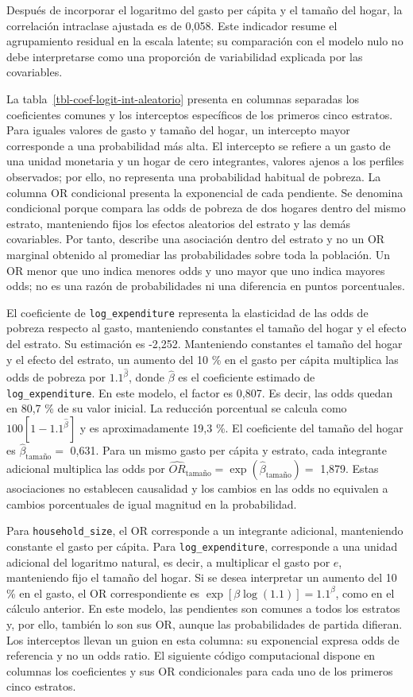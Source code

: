\documentclass[
  spanish,
  11pt,
  letterpaper,
  oneside,
  open=any]{scrbook}
\begin{document}
Después de incorporar el logaritmo del gasto per cápita y el tamaño del
hogar, la correlación intraclase ajustada es de 0,058. Este indicador
resume el agrupamiento residual en la escala latente; su comparación con
el modelo nulo no debe interpretarse como una proporción de variabilidad
explicada por las covariables.

La tabla~\ref{tbl-coef-logit-int-aleatorio} presenta en columnas
separadas los coeficientes comunes y los interceptos específicos de los
primeros cinco estratos. Para iguales valores de gasto y tamaño del
hogar, un intercepto mayor corresponde a una probabilidad más alta. El
intercepto se refiere a un gasto de una unidad monetaria y un hogar de
cero integrantes, valores ajenos a los perfiles observados; por ello, no
representa una probabilidad habitual de pobreza. La columna OR
condicional presenta la exponencial de cada pendiente. Se denomina
condicional porque compara las odds de pobreza de dos hogares dentro del
mismo estrato, manteniendo fijos los efectos aleatorios del estrato y
las demás covariables. Por tanto, describe una asociación dentro del
estrato y no un OR marginal obtenido al promediar las probabilidades
sobre toda la población. Un OR menor que uno indica menores odds y uno
mayor que uno indica mayores odds; no es una razón de probabilidades ni
una diferencia en puntos porcentuales.

El coeficiente de \texttt{log\_expenditure} representa la elasticidad de
las odds de pobreza respecto al gasto, manteniendo constantes el tamaño
del hogar y el efecto del estrato. Su estimación es -2,252. Manteniendo
constantes el tamaño del hogar y el efecto del estrato, un aumento del
10 \% en el gasto per cápita multiplica las odds de pobreza por
\(1.1^{\hat{\beta}}\), donde \(\hat{\beta}\) es el coeficiente estimado
de \texttt{log\_expenditure}. En este modelo, el factor es 0,807. Es
decir, las odds quedan en 80,7 \% de su valor inicial. La reducción
porcentual se calcula como \(100[1-1.1^{\hat{\beta}}]\) y es
aproximadamente 19,3 \%. El coeficiente del tamaño del hogar es
\(\hat\beta_{\mathrm{tamaño}}=\) 0,631. Para un mismo gasto per cápita y
estrato, cada integrante adicional multiplica las odds por
\(\widehat{OR}_{\mathrm{tamaño}}=\exp(\hat\beta_{\mathrm{tamaño}})=\)
1,879. Estas asociaciones no establecen causalidad y los cambios en las
odds no equivalen a cambios porcentuales de igual magnitud en la
probabilidad.

Para \texttt{household\_size}, el OR corresponde a un integrante
adicional, manteniendo constante el gasto per cápita. Para
\texttt{log\_expenditure}, corresponde a una unidad adicional del
logaritmo natural, es decir, a multiplicar el gasto por \(e\),
manteniendo fijo el tamaño del hogar. Si se desea interpretar un aumento
del 10 \% en el gasto, el OR correspondiente es
\(\exp[\beta\log(1.1)]=1.1^\beta\), como en el cálculo anterior. En este
modelo, las pendientes son comunes a todos los estratos y, por ello,
también lo son sus OR, aunque las probabilidades de partida difieran.
Los interceptos llevan un guion en esta columna: su exponencial expresa
odds de referencia y no un odds ratio. El siguiente código computacional
dispone en columnas los coeficientes y sus OR condicionales para cada
uno de los primeros cinco estratos.
\end{document}
